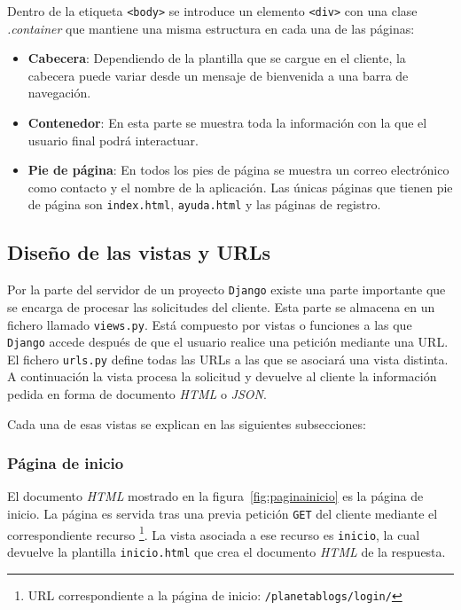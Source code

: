 \documentclass[a4paper, 12pt]{book}
\begin{document}
Dentro de la etiqueta \texttt{<body>} se introduce un elemento \texttt{<div>} con una clase \textit{.container} que mantiene una misma estructura en cada 
una de las p\'aginas:
\begin{itemize}
  \item {\bfseries Cabecera}: Dependiendo de la plantilla que se cargue en el cliente, la cabecera puede variar desde un mensaje de bienvenida a una barra
  de navegaci\'on.
  \item {\bfseries Contenedor}: En esta parte se muestra toda la informaci\'on con la que el usuario final podr\'a interactuar.
  \item {\bfseries Pie de p\'agina}: En todos los pies de p\'agina se muestra un correo electr\'onico como contacto y el nombre de la aplicaci\'on. 
  Las \'unicas p\'aginas que tienen pie de p\'agina son \texttt{index.html}, \texttt{ayuda.html} y las p\'aginas de registro.
\end{itemize}

\subsection{Dise\~no de las vistas y URLs} 
\label{sec:vistasurls}
Por la parte del servidor de un proyecto \texttt{Django} existe una parte importante que se encarga de procesar las solicitudes del cliente. Esta parte se
almacena en un fichero llamado \texttt{views.py}. Est\'a compuesto por vistas o funciones a las que \texttt{Django} accede despu\'es de que el usuario 
realice una petici\'on mediante una URL. El fichero \texttt{urls.py} define todas las URLs a las que se asociar\'a una vista distinta. A continuaci\'on
la vista procesa la solicitud y devuelve al cliente la informaci\'on pedida en forma de documento \textit{HTML} o \textit{JSON}.

Cada una de esas vistas se explican en las siguientes subsecciones:

\subsubsection{P\'agina de inicio} 
\label{sec:paginainicio}
El documento \textit{HTML} mostrado en la figura~\ref{fig:paginainicio} es la p\'agina de inicio. La p\'agina es servida tras una previa petici\'on \texttt{GET} del cliente 
mediante el correspondiente recurso \footnote{URL correspondiente a la p\'agina de inicio: \texttt{/planetablogs/login/}}. La vista asociada a ese recurso 
es \texttt{inicio}, la cual devuelve la plantilla \texttt{inicio.html} que crea el documento \textit{HTML} de la respuesta.
\end{document}
